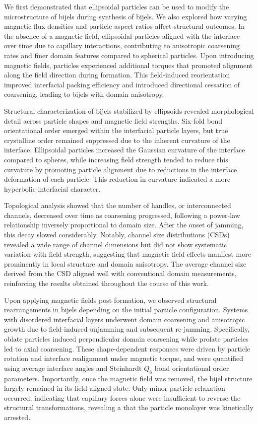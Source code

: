 We first demonstrated that ellipsoidal particles can be used to modify the microstructure of bijels during synthesis of bijels.
We also explored how varying magnetic flux densities and particle aspect ratios affect structural outcomes. 
In the absence of a magnetic field, ellipsoidal particles aligned with the interface over time due to capillary interactions, contributing to 
anisotropic coarsening rates and finer domain features compared to spherical particles. Upon introducing magnetic fields, particles experienced 
additional torques that promoted alignment along the field direction during formation. This field-induced reorientation improved interfacial 
packing efficiency and introduced directional cessation of coarsening, leading to bijels with domain anisotropy.

Structural characterization of bijels stabilized by ellipsoids revealed morphological detail across particle shapes and magnetic field strengths. 
Six-fold bond orientational order emerged within the interfacial particle layers, but true crystalline order remained suppressed due to the 
inherent curvature of the interface. Ellipsoidal particles increased the Gaussian curvature of the interface compared 
to spheres, while increasing field strength tended to reduce this curvature by promoting particle alignment due to reductions in the interface
deformation of each particle. This reduction in curvature indicated a more hyperbolic interfacial character.

Topological analysis showed that the number of handles, or interconnected channels, decreased over time as coarsening progressed, following 
a power-law relationship inversely proportional to domain size. After the onset of jamming, this decay slowed considerably. Notably, 
channel size distributions (CSDs) revealed a wide range of channel dimensions but did not show systematic variation with 
field strength, suggesting that magnetic field effects manifest more prominently in local structure and domain anisotropy. The 
average channel size derived from the CSD aligned well with conventional domain measurements, reinforcing the results obtained throughout
the course of this work.

Upon applying magnetic fields post formation, we observed structural rearrangements in bijels depending on the initial particle 
configuration. Systems with disordered interfacial layers underwent domain coarsening and anisotropic growth due to field-induced unjamming 
and subsequent re-jamming. Specifically, oblate particles induced perpendicular domain coarsening while prolate particles led 
to axial coarsening. These shape-dependent responses were driven by particle rotation and interface realignment under magnetic 
torque, and were quantified using average interface angles and Steinhardt $Q_6$ bond orientational order parameters. Importantly, once the 
magnetic field was removed, the bijel structure largely remained in its field-aligned state. Only minor particle relaxation occurred, 
indicating that capillary forces alone were insufficient to reverse the structural transformations, revealing a that the particle monolayer
was kinetically arrested.

